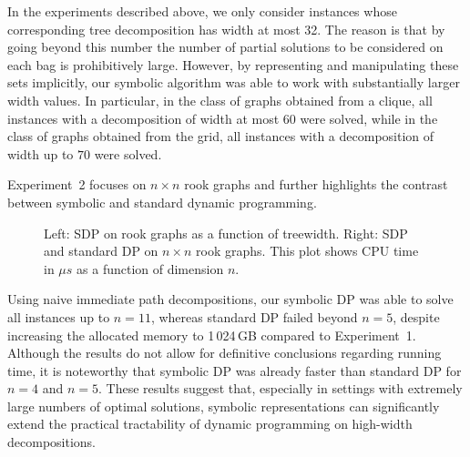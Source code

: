 In the experiments described above, we only consider instances whose corresponding tree decomposition has width at most 32. The reason is that by going beyond this number the number of partial solutions to be considered on each bag is prohibitively large. However, by representing and manipulating these sets implicitly, our symbolic algorithm was able to work with substantially larger width values. In particular, in the class of graphs obtained from a clique, all instances with a decomposition of width at most 60 were solved, while in the class of graphs obtained from the grid, all instances with a decomposition of width up to $70$ were solved. 

Experiment~2 focuses on $n \times n$ rook graphs and further highlights the
contrast between symbolic and standard dynamic programming. 

\begin{figure}[h]
    \begin{subfigure}{0.48\textwidth}
        \centering
         \resizebox{\textwidth}{!}{}
        \label{fig:rookbytreewidth}
    \end{subfigure}
    \hfill
    \begin{subfigure}{0.48\textwidth}       
    \centering
    \resizebox{\textwidth}{!}{}
        \label{fig:rookbysize}
    \end{subfigure}
    \caption{Left: SDP on rook graphs as a function of treewidth. Right: SDP and standard DP on $n \times n$ rook graphs. This plot shows CPU time in $\mu s$ as a function of dimension $n$.   \label{fig:RookComparison}}
   
\end{figure}

Using naive
immediate path decompositions, our symbolic DP was able to solve all instances
up to $n=11$, whereas standard DP failed beyond $n=5$, despite increasing the
allocated memory to 1\,024\,GB compared to Experiment~1. Although the results do
not allow for definitive conclusions regarding running time, it is noteworthy
that symbolic DP was already faster than standard DP for $n=4$ and $n=5$. These
results suggest that, especially in settings with extremely large numbers of optimal
solutions, symbolic representations can significantly extend the practical
tractability of dynamic programming on high-width decompositions.



